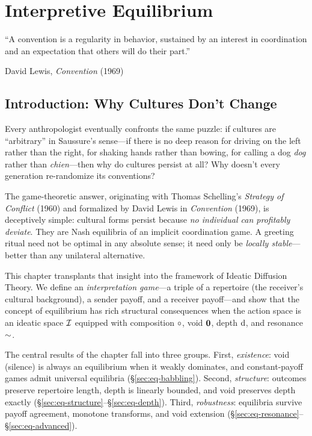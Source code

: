 \chapter{Interpretive Equilibrium}
\label{ch:equilibrium}

\epigraph{%
  ``A convention is a regularity in behavior, sustained by an interest in
  coordination and an expectation that others will do their part.''}%
  {David Lewis, \textit{Convention} (1969)}

\section{Introduction: Why Cultures Don't Change}
\label{sec:eq-intro}

Every anthropologist eventually confronts the same puzzle: if cultures are
``arbitrary'' in Saussure's sense---if there is no deep reason for driving
on the left rather than the right, for shaking hands rather than bowing,
for calling a dog \emph{dog} rather than \emph{chien}---then why do cultures
persist at all?  Why doesn't every generation re-randomize its conventions?

The game-theoretic answer, originating with Thomas Schelling's
\emph{Strategy of Conflict} (1960) and formalized by David Lewis in
\emph{Convention} (1969), is deceptively simple: cultural forms persist
because \emph{no individual can profitably deviate}.  They are Nash equilibria
of an implicit coordination game.  A greeting ritual need not be optimal in
any absolute sense; it need only be \emph{locally stable}---better than any
unilateral alternative.

This chapter transplants that insight into the framework of Ideatic Diffusion
Theory.  We define an \emph{interpretation game}---a triple of a repertoire
(the receiver's cultural background), a sender payoff, and a receiver
payoff---and show that the concept of equilibrium has rich structural
consequences when the action space is an ideatic space $\mathcal{I}$ equipped with
composition $\circ$, void $\mathbf{0}$, depth $\operatorname{d}$, and resonance
$\sim$.

The central results of the chapter fall into three groups.  First,
\emph{existence}: void (silence) is always an equilibrium when it weakly
dominates, and constant-payoff games admit universal equilibria
(\S\ref{sec:eq-babbling}).  Second, \emph{structure}: outcomes preserve
repertoire length, depth is linearly bounded, and void preserves depth
exactly (\S\ref{sec:eq-structure}--\S\ref{sec:eq-depth}).  Third,
\emph{robustness}: equilibria survive payoff agreement, monotone transforms,
and void extension (\S\ref{sec:eq-resonance}--\S\ref{sec:eq-advanced}).

